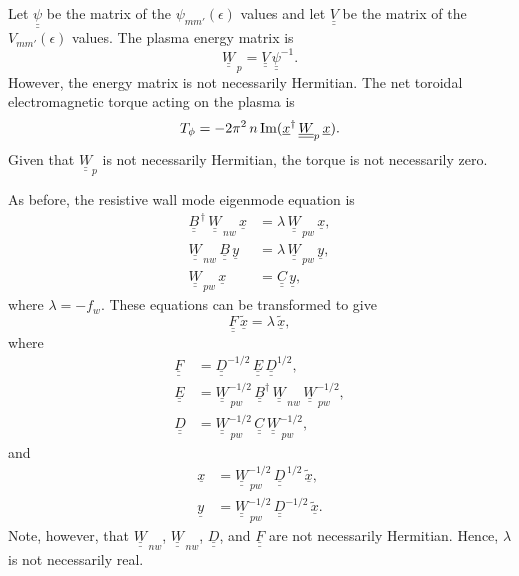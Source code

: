 \documentclass[12pt,prb,aps,notitlepage]{revtex4-1}
\begin{document}
Let $\underline{\underline{\psi}}$ be the matrix of the $\psi_{mm'}(\epsilon)$ values and let $\underline{\underline{V}}$ be the matrix of the
$V_{mm'}(\epsilon)$ values. The plasma energy matrix is
\begin{equation}
\underline{\underline{W}}_{\,p} = \underline{\underline{V}}\,\underline{\underline{\psi}}^{-1}.
\end{equation}
However, the energy matrix is not necessarily  Hermitian. The net toroidal electromagnetic torque acting on the plasma is
\begin{equation}
T_\phi = -2\pi^2\,n\,{\rm Im}(\underline{x}^\dag\,\underline{\underline{W}}_p\,\underline{x}).
\end{equation}
Given that $\underline{\underline{W}}_p$ is not necessarily Hermitian, the torque is not necessarily zero. 

As before, the resistive wall mode eigenmode equation is 
\begin{align}
\underline{\underline{B}}^{\,\dag}\,\underline{\underline{W}}_{\,nw}\,\underline{x}&=\lambda\,\underline{\underline{W}}_{\,pw}\,\underline{x},\\[0.5ex]
\underline{\underline{W}}_{\,nw}\,\underline{\underline{B}}\,\underline{y} &=\lambda\,\underline{\underline{W}}_{\,pw}\,\underline{y},\\[0.5ex]
\underline{\underline{W}}_{\,pw}\,\underline{x}&= 
\underline{\underline{C}}\,\underline{y},
\end{align}
where $\lambda=-f_w$. 
These equations can be transformed to give
\begin{equation}
\underline{\underline{F}}\,\underline{\tilde{x}}= \lambda\,\underline{\tilde{x}},
\end{equation}
where
\begin{align}
\underline{\underline{F}} &= \underline{\underline{D}}^{-1/2}\,\underline{\underline{E}}\,\underline{\underline{D}}^{1/2},\\[0.5ex]
\underline{\underline{E}} &= \underline{\underline{W}}_{\,pw}^{-1/2}\,\underline{\underline{B}}^\dag\,\underline{\underline{W}}_{\,nw}\, \underline{\underline{W}}_{\,pw}^{-1/2},\\[0.5ex]
\underline{\underline{D}} &=  \underline{\underline{W}}_{\,pw}^{-1/2} \,\underline{\underline{C}} \,\underline{\underline{W}}_{\,pw}^{-1/2},
\end{align}
and
\begin{align}
\underline{x} &= \underline{\underline{W}}_{\,pw}^{-1/2}\, \underline{\underline{D}}^{\,1/2}\,\underline{\tilde{x}},\\[0.5ex]
\underline{y} &= \underline{\underline{W}}_{\,pw}^{-1/2}\, \underline{\underline{D}}^{-1/2}\,\underline{\tilde{x}}.
\end{align}
Note, however, that $\underline{\underline{W}}_{\,nw}$, $\underline{\underline{W}}_{\,nw}$, $ \underline{\underline{D}}$, and $\underline{\underline{F}}$
are not necessarily Hermitian. Hence, $\lambda$ is  not necessarily real.
\end{document}
